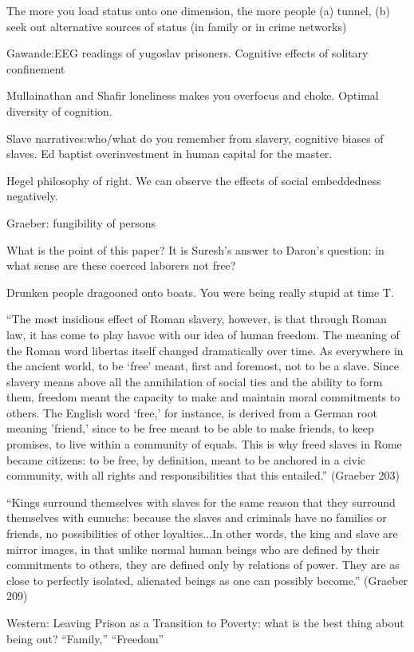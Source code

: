 \documentclass[10pt,a4paper]{article}
\begin{document}
 The more you load status onto one dimension, the more people (a) tunnel, (b) seek out alternative
 sources of status (in family or in crime networks)
 
 
 Gawande:EEG readings of yugoslav prisoners. Cognitive effects of solitary confinement
 
 Mullainathan and Shafir loneliness makes you overfocus and choke. Optimal diversity of cognition.
 
 
 Slave narratives:who/what do you remember from slavery, cognitive biases of slaves. Ed baptist overinvestment in human capital for the master.
 
 Hegel philosophy of right.
 We can observe the effects of social embeddedness negatively. 
 
 Graeber: fungibility of persons
 
 What is the point of this paper? It is Suresh's answer to Daron's question: 
 in what sense are these coerced laborers not free?
 
 Drunken people dragooned onto boats. You were being really stupid at time T. 
 
 ``The most insidious effect of Roman slavery, however, is that through Roman law, 
 it has come to play havoc with our idea of human freedom. The meaning of the Roman 
 word libertas itself changed dramatically over time. As everywhere in the ancient world, 
 to be `free' meant, first and foremost, not to be a slave. Since slavery means above all 
 the annihilation of social ties and the ability to form them, freedom meant the capacity 
 to make and maintain moral commitments to others. The English word `free,' for instance, 
 is derived from a German root meaning 'friend,' since to be free meant to be able to 
 make friends, to keep promises, to live within a community of equals. This is why freed 
 slaves in Rome became citizens: to be free, by definition, meant to be anchored in a 
 civic community, with all rights and responsibilities that this entailed.'' (Graeber 203)
 
 ``Kings surround themselves with slaves for the same reason that they surround 
 themselves with eunuchs: because the slaves and criminals have no families or friends, 
 no possibilities of other loyalties...In other words, the king and slave are mirror images, 
 in that unlike normal human beings who are defined by their commitments to others, they are 
 defined only by relations of power. They are as close to perfectly isolated, alienated 
 beings as one can possibly become.'' (Graeber 209)
 
 Western: Leaving Prison as a Transition to Poverty: what is the best thing about being out?
 ``Family,'' ``Freedom''
 
\end{document}
